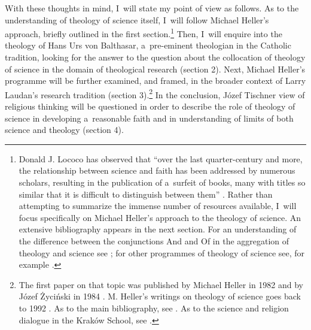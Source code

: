 With these thoughts in mind, I~will state my point of view as follows. As to the understanding of theology of science itself, I~will follow Michael Heller's approach, briefly outlined in the first section.\footnote{Donald J. Lococo has observed that ``over the last quarter-century and more, the relationship between science and faith has been addressed by numerous scholars, resulting in the publication of a~surfeit of books, many with titles so similar that it is difficult to distinguish between them'' 
\parencite[][p.10]{lococo_life_2021}. %
 Rather than attempting to summarize the immense number of resources available, I~will focus specifically on Michael Heller's approach to the theology of science. An extensive bibliography appears in the next section. For an understanding of the difference between the conjunctions And and Of in the aggregation of theology and science see 
\parencite[][pp.1–4]{tyson_christian_2022}; %
 for other programmes of theology of science see, for example 
\parencites[][]{lococo_towards_2002}[][]{lococo_life_2021}[][]{rodzen_teologia_2021}[][]{tyson_christian_2022}[][]{wilkinson_after_2022}.%
} Then, I~will enquire into the theology of Hans Urs von Balthasar, a~pre-eminent theologian in the Catholic tradition, looking for the answer to the question about the collocation of theology of science in the domain of theological research (section 2). Next, Michael Heller's programme will be further examined, and framed, in the broader context of Larry Laudan's research tradition (section 3).\footnote{The first paper on that topic was published by Michael Heller in 1982 and by Józef Życiński in 1984 
\parencites[][]{heller_stworzenie_1982}[][]{zycinski_w_1984}[see][]{polak_teologia_2015}[][]{rodzen_teologia_2021}. %
 M. Heller's writings on theology of science goes back to 1992 
\parencite[for an overview se][pp.759–760]{oleksowicz_we_2020}. %
 As to the main bibliography, see 
\parencites[][]{heller_new_1996}[][]{maczka_wstep_2015}[][]{macek_teologia_2014}[][]{maczka_teologia_2015}[][]{maziarka_w_2016}[][]{polak_teologia_2016}[][]{oleksowicz_we_2020}[][]{rodzen_teologia_2021}. %
 As to the science and religion dialogue in the Kraków School, see 
\parencites[][]{brozek_science_2015}[][]{obolevitch_relationship_2015}[][]{polak_science-religion_2021}[][]{polak_theory_2023}.%
} In the conclusion, Józef Tischner view of religious thinking will be questioned in order to describe the role of theology of science in developing a~reasonable faith and in understanding of limits of both science and theology (section 4).



